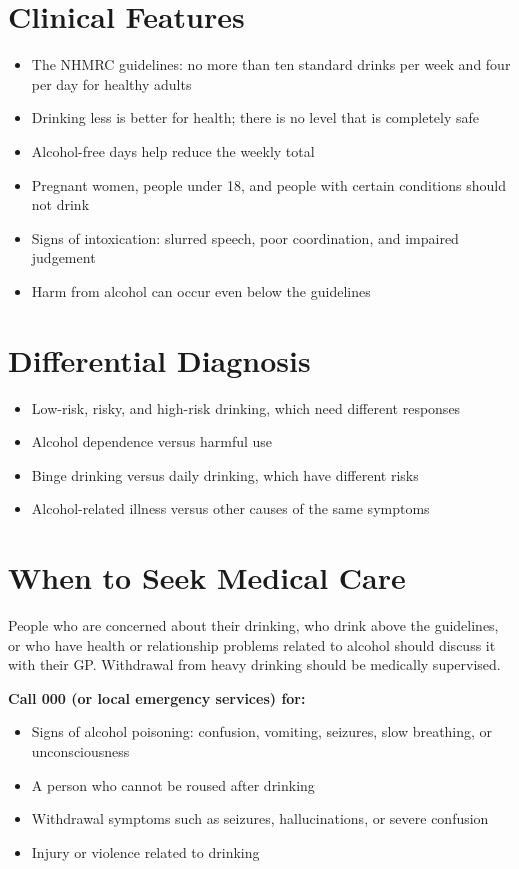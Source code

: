 \section*{Clinical Features}
\begin{itemize}
    \item The NHMRC guidelines: no more than ten standard drinks per week and four per day for healthy adults
    \item Drinking less is better for health; there is no level that is completely safe
    \item Alcohol-free days help reduce the weekly total
    \item Pregnant women, people under 18, and people with certain conditions should not drink
    \item Signs of intoxication: slurred speech, poor coordination, and impaired judgement
    \item Harm from alcohol can occur even below the guidelines
\end{itemize}

\section*{Differential Diagnosis}
\begin{itemize}
    \item Low-risk, risky, and high-risk drinking, which need different responses
    \item Alcohol dependence versus harmful use
    \item Binge drinking versus daily drinking, which have different risks
    \item Alcohol-related illness versus other causes of the same symptoms
\end{itemize}

\section*{When to Seek Medical Care}
People who are concerned about their drinking, who drink above the guidelines, or who have health or relationship problems related to alcohol should discuss it with their GP. Withdrawal from heavy drinking should be medically supervised.

\textbf{Call 000 (or local emergency services) for:}
\begin{itemize}
    \item Signs of alcohol poisoning: confusion, vomiting, seizures, slow breathing, or unconsciousness
    \item A person who cannot be roused after drinking
    \item Withdrawal symptoms such as seizures, hallucinations, or severe confusion
    \item Injury or violence related to drinking
\end{itemize}

